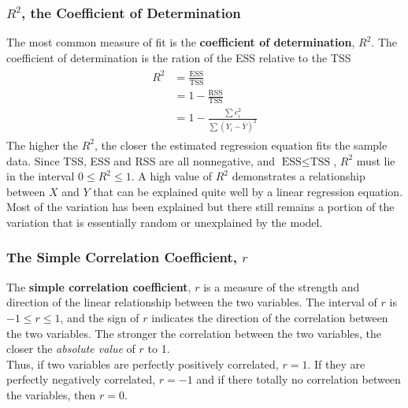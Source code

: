 \documentclass[11pt]{article}
\begin{document}
\subsubsection{$R^2$, the Coefficient of Determination}
The most common measure of fit is the \textbf{coefficient of determination}, $R^2$. The coefficient of determination is the ration of the ESS relative to the TSS
\begin{align} \label{eg2_14}
\begin{split}
R^2 &= \frac{\text{ESS}}{\text{TSS}} \\
&= 1- \frac{\text{RSS}}{\text{TSS}} \\
&= 1- \frac{\sum e_i^2}{\sum (Y_i - \bar{Y})^2}
\end{split}
\end{align}
The higher the $R^2$, the closer the estimated regression equation fits the sample data. Since TSS, ESS and RSS are all nonnegative, and $\text{ESS}\leq \text{TSS}$, $R^2$ must lie in the interval $0\leq R^2 \leq 1$.
A high value of $R^2$ demonstrates a relationship between $X$ and $Y$ that can be explained quite well by a linear regression equation. Most of the variation has been explained but there still remains a portion of the variation that is essentially random or unexplained by the model.
\subsubsection{The Simple Correlation Coefficient, $r$}
The \textbf{simple correlation coefficient}, $r$ is a measure of the strength and direction of the linear relationship between the two variables. The interval of $r$ is $-1\leq r \leq 1$, and the sign of $r$ indicates the direction of the correlation between the two variables. The stronger the correlation between the two variables, the closer the \textit{absolute value} of $r$ to 1.\\
Thus, if two variables are perfectly positively correlated, $r=1$. If they are perfectly negatively correlated, $r=-1$ and if there totally no correlation between the variables, then $r=0$.
\end{document}
